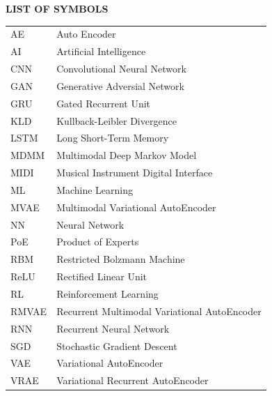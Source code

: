 \documentclass[12pt]{report}
\begin{document}
\begin{center}
    \textbf{\Large LIST OF SYMBOLS}\\
    \vspace{2cm}
    \begin{table} [ht]
        \begin{center}
            \begin{tabular} {ll}
            AE & Auto Encoder \\
            AI & Artificial Intelligence \\
            CNN & Convolutional Neural Network \\
            GAN & Generative Adversial Network \\
            GRU & Gated Recurrent Unit \\
            KLD & Kullback-Leibler Divergence \\
            LSTM & Long Short-Term Memory \\
            MDMM & Multimodal Deep Markov Model \\
            MIDI & Musical Instrument Digital Interface \\
            ML & Machine Learning \\
            MVAE & Multimodal Variational AutoEncoder \\
            NN & Neural Network \\
            PoE & Product of Experts \\
            RBM & Restricted Bolzmann Machine \\
            ReLU & Rectified Linear Unit \\
            RL & Reinforcement Learning \\
            RMVAE & Recurrent Multimodal Variational AutoEncoder \\
            RNN & Recurrent Neural Network \\
            SGD & Stochastic Gradient Descent \\
            VAE & Variational AutoEncoder \\
            VRAE & Variational Recurrent AutoEncoder \\
            \end{tabular}
        \end{center}
    \end{table}
    
\end{center}
\newpage

\end{document}

